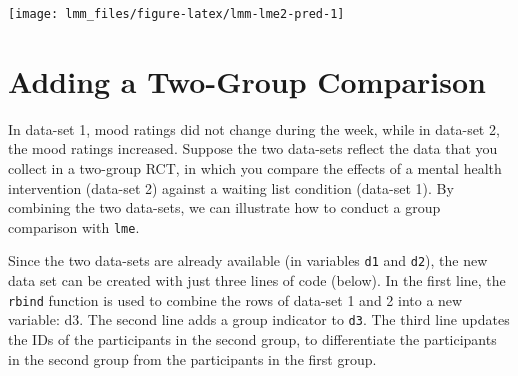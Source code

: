 \documentclass[]{book}
\newenvironment{Shaded}{\begin{snugshade}}{\end{snugshade}}
\newcommand{\KeywordTok}[1]{\textcolor[rgb]{0.13,0.29,0.53}{\textbf{#1}}}
\newcommand{\DataTypeTok}[1]{\textcolor[rgb]{0.13,0.29,0.53}{#1}}
\newcommand{\DecValTok}[1]{\textcolor[rgb]{0.00,0.00,0.81}{#1}}
\newcommand{\FloatTok}[1]{\textcolor[rgb]{0.00,0.00,0.81}{#1}}
\newcommand{\StringTok}[1]{\textcolor[rgb]{0.31,0.60,0.02}{#1}}
\newcommand{\OtherTok}[1]{\textcolor[rgb]{0.56,0.35,0.01}{#1}}
\newcommand{\OperatorTok}[1]{\textcolor[rgb]{0.81,0.36,0.00}{\textbf{#1}}}
\newcommand{\NormalTok}[1]{#1}
\begin{document}
\begin{Shaded}
\end{Shaded}

\begin{center}\texttt{[image: lmm\_files/figure-latex/lmm-lme2-pred-1]} \end{center}

\section{Adding a Two-Group
Comparison}\label{adding-a-two-group-comparison}

In data-set 1, mood ratings did not change during the week, while in
data-set 2, the mood ratings increased. Suppose the two data-sets
reflect the data that you collect in a two-group RCT, in which you
compare the effects of a mental health intervention (data-set 2) against
a waiting list condition (data-set 1). By combining the two data-sets,
we can illustrate how to conduct a group comparison with \texttt{lme}.

Since the two data-sets are already available (in variables \texttt{d1}
and \texttt{d2}), the new data set can be created with just three lines
of code (below). In the first line, the \texttt{rbind} function is used
to combine the rows of data-set 1 and 2 into a new variable: d3. The
second line adds a group indicator to \texttt{d3}. The third line
updates the IDs of the participants in the second group, to
differentiate the participants in the second group from the participants
in the first group.
\end{document}
